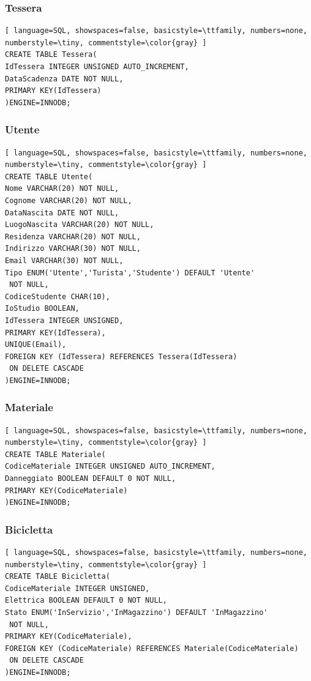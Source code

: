 \documentclass[a4paper,twoside]{article}
\begin{document}
\subsubsection{Tessera}
\begin{lstlisting}[ language=SQL, showspaces=false, basicstyle=\ttfamily, numbers=none, numberstyle=\tiny, commentstyle=\color{gray} ]
CREATE TABLE Tessera(
IdTessera INTEGER UNSIGNED AUTO_INCREMENT,
DataScadenza DATE NOT NULL,
PRIMARY KEY(IdTessera)
)ENGINE=INNODB;
\end{lstlisting}
\subsubsection{Utente}
\begin{lstlisting}[ language=SQL, showspaces=false, basicstyle=\ttfamily, numbers=none, numberstyle=\tiny, commentstyle=\color{gray} ]
CREATE TABLE Utente(
Nome VARCHAR(20) NOT NULL,
Cognome VARCHAR(20) NOT NULL,
DataNascita DATE NOT NULL,
LuogoNascita VARCHAR(20) NOT NULL,
Residenza VARCHAR(20) NOT NULL,
Indirizzo VARCHAR(30) NOT NULL,
Email VARCHAR(30) NOT NULL,
Tipo ENUM('Utente','Turista','Studente') DEFAULT 'Utente'
 NOT NULL,
CodiceStudente CHAR(10),
IoStudio BOOLEAN,
IdTessera INTEGER UNSIGNED,
PRIMARY KEY(IdTessera),
UNIQUE(Email),
FOREIGN KEY (IdTessera) REFERENCES Tessera(IdTessera)
 ON DELETE CASCADE
)ENGINE=INNODB;
\end{lstlisting}
\subsubsection{Materiale}
\begin{lstlisting}[ language=SQL, showspaces=false, basicstyle=\ttfamily, numbers=none, numberstyle=\tiny, commentstyle=\color{gray} ]
CREATE TABLE Materiale(
CodiceMateriale INTEGER UNSIGNED AUTO_INCREMENT,
Danneggiato BOOLEAN DEFAULT 0 NOT NULL,
PRIMARY KEY(CodiceMateriale)
)ENGINE=INNODB;
\end{lstlisting}
\subsubsection{Bicicletta}
\begin{lstlisting}[ language=SQL, showspaces=false, basicstyle=\ttfamily, numbers=none, numberstyle=\tiny, commentstyle=\color{gray} ]
CREATE TABLE Bicicletta(
CodiceMateriale INTEGER UNSIGNED,
Elettrica BOOLEAN DEFAULT 0 NOT NULL,
Stato ENUM('InServizio','InMagazzino') DEFAULT 'InMagazzino'
 NOT NULL,
PRIMARY KEY(CodiceMateriale),
FOREIGN KEY (CodiceMateriale) REFERENCES Materiale(CodiceMateriale)
 ON DELETE CASCADE
)ENGINE=INNODB;
\end{lstlisting}
\end{document}
